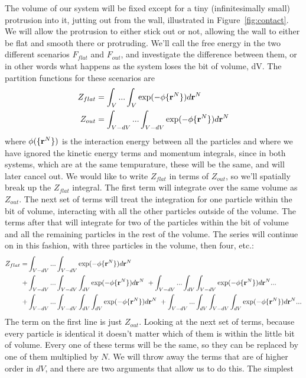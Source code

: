The volume of our system will be fixed except for a tiny
(infinitesimally small) protrusion into it, jutting out from the wall,
illustrated in Figure~\ref{fig:contact}.  We will allow the protrusion
to either stick out or not, allowing the wall to either be flat and
smooth there or protruding.  We'll call the free energy in the two
different scenarios $F_{flat}$ and $F_{out}$, and investigate the
difference between them, or in other words what happens as the system
loses the bit of volume, dV.  The partition functions for these
scenarios are
\begin{align}
Z_{flat} &= \int_V... \int_V \exp(-\phi \{\textbf{r}^N \})d\textbf{r}^N \\
Z_{out} &=  \int_{V-dV}... \int_{V-dV} \exp(-\phi \{\textbf{r}^N \})d\textbf{r}^N
\end{align}
where $\phi (\{\textbf{r}^N \})$ is the interaction energy between all the
particles and where we have ignored the kinetic energy terms and
momentum integrals, since in both systems, which are at the same
tempurature, these will be the same, and will later cancel out.  We
would like to write $Z_{flat}$ in terms of $Z_{out}$, so we'll
spatially break up the $Z_{flat}$ integral.  The first term will
integrate over the same volume as $Z_{out}$.  The next set of terms
will treat the integration for one particle within the bit of volume,
interacting with all the other particles outside of the volume.  The
terms after that will integrate for two of the particles within the
bit of volume and all the remaining particles in the rest of the
volume.  The series will continue on in this fashion, with three
particles in the volume, then four, etc.:
\begin{align}
Z_{flat} = &\int_{V-dV}... \int_{V-dV} \exp(-\phi \{\textbf{r}^N \})d\textbf{r}^N \notag \\
+ &\int_{V-dV}... \int_{V-dV} \int_{dV} \exp(-\phi \{ \textbf{r}^N \})d\textbf{r}^N \
+ \int_{V-dV} ... \int_{dV} \int_{V-dV} \exp(-\phi \{ \textbf{r}^N \})d\textbf{r}^N ... \notag \\
+ &\int_{V-dV}... \int_{V-dV}\int_{dV} \int_{dV} \exp(-\phi \{\textbf{r}^N \})d\textbf{r}^N \
+ \int_{V-dV}... \int_{dV}\int_{V-dV} \int_{dV} \exp(-\phi \{\textbf{r}^N \})d\textbf{r}^N ...
\end{align}
The term on the first line is just $Z_{out}$.  Looking at the next set
of terms, because every particle is identical it doesn't matter which
of them is within the little bit of volume.  Every one of these terms
will be the same, so they can be replaced by one of them multiplied by
$N$.  We will throw away the terms that are of higher order in $dV$,
and there are two arguments that allow us to do this.  The simplest
